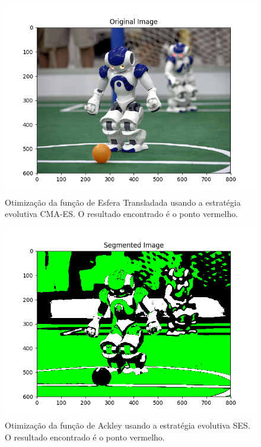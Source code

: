 \documentclass[conference]{IEEEtran}
\begin{document}
\begin{figure}[htbp]
\centering
\centerline{\includegraphics[scale=0.5]{imagens/color_segmentation/original_image.png}}
\caption{Otimização da função de Esfera Transladada usando a estratégia evolutiva CMA-ES. O resultado encontrado é o ponto vermelho.}
\label{color_segmentation/original_image}
\end{figure}

\begin{figure}[htbp]
\centering
\centerline{\includegraphics[scale=0.5]{imagens/color_segmentation/segmented_image.png}}
\caption{Otimização da função de Ackley usando a estratégia evolutiva SES. O resultado encontrado é o ponto vermelho.}
\label{color_segmentation/segmented_image}
\end{figure} 
\end{document}
